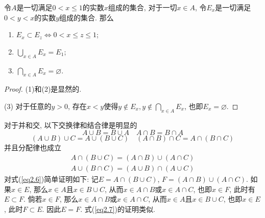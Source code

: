 \documentclass[cn,12pt,math=mtpro2,citestyle=gb7714-2015,bibstyle=gb7714-2015,twocol]{elegantbook}
\let\emptyset\varnothing
\begin{document}
\begin{example}
令$A$是一切满足$0<x\leq 1$的实数$x$组成的集合, 对于一切$ x \in A$, 令$E_x$是一切满足$0<y<x$的实数$y$组成的集合. 那么
\begin{enumerate}[label=(\arabic*)]
\item $E_x\subset E_z \Leftrightarrow 0<x\leq z\leq 1$;
\item $\bigcup_{x\in A}E_x=E_1$;
\item $\bigcap_{x\in A}E_x=\emptyset$.
\end{enumerate}
\begin{proof}
(1)和(2)是显然的.

(3) 对于任意的$y>0$, 存在$x<y$使得$y \notin E_x, y \notin \bigcap_{x\in A}E_x$, 也即$E_x=\emptyset$.
\end{proof}
\end{example}
对于并和交, 以下交换律和结合律是明显的
$$A\cup B=B\cup A\quad A\cap B=B\cap A $$
$$(A\cup B)\cup C=A\cup (B\cup C)\quad (A\cap B)\cap C=A\cap (B\cap C)$$
并且分配律也成立
\begin{align}
A\cap(B\cup C)=(A\cap B)\cup(A\cap C) \label{eq2.6}\\
A\cup(B\cap C)=(A\cup B)\cap(A\cup C) \label{eq2.7}
\end{align}
对式(\ref{eq2.6})简单证明如下: 记$E=A\cap(B\cup C)$, $F=(A\cap B)\cup(A\cap C)$. 如果$x\in E$, 那么$x\in A$且$x\in B\cup C$, 从而$x\in A\cap B$或$x\in A\cap C$, 也即$x\in F$, 此时有$E\subset F$. 倘若$x\in F$, 那么$x \in A\cap B$或$x \in A\cap C$, 从而$x\in A$且$x\in B\cup C$, 也即$x\in E$, 此时$F\subset E$. 因此$E=F$. 式(\ref{eq2.7})的证明类似.
\end{document}
